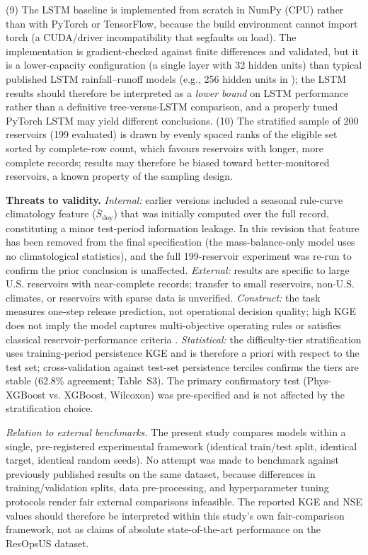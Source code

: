 \documentclass[journal]{ascelike-new}
\begin{document}
(9) The LSTM baseline is implemented from scratch in NumPy (CPU) rather than with PyTorch or TensorFlow, because the build environment cannot import torch (a CUDA/driver incompatibility that segfaults on load). The implementation is gradient-checked against finite differences and validated, but it is a lower-capacity configuration (a single layer with 32 hidden units) than typical published LSTM rainfall--runoff models (e.g., 256 hidden units in \citet{Kratzert2018}); the LSTM results should therefore be interpreted as a \emph{lower bound} on LSTM performance rather than a definitive tree-versus-LSTM comparison, and a properly tuned PyTorch LSTM may yield different conclusions. (10) The stratified sample of 200 reservoirs (199 evaluated) is drawn by evenly spaced ranks of the eligible set sorted by complete-row count, which favours reservoirs with longer, more complete records; results may therefore be biased toward better-monitored reservoirs, a known property of the sampling design.


\textbf{Threats to validity.} \emph{Internal:} earlier versions included a seasonal rule-curve climatology feature ($\bar S_{\text{doy}}$) that was initially computed over the full record, constituting a minor test-period information leakage. In this revision that feature has been removed from the final specification (the mass-balance-only model uses no climatological statistics), and the full 199-reservoir experiment was re-run to confirm the prior conclusion is unaffected. \emph{External:} results are specific to large U.S. reservoirs with near-complete records; transfer to small reservoirs, non-U.S. climates, or reservoirs with sparse data is unverified. \emph{Construct:} the task measures one-step release prediction, not operational decision quality; high KGE does not imply the model captures multi-objective operating rules or satisfies classical reservoir-performance criteria \citep{Hashimoto1982}. \emph{Statistical:} the difficulty-tier stratification uses training-period persistence KGE and is therefore a priori with respect to the test set; cross-validation against test-set persistence terciles confirms the tiers are stable (62.8\% agreement; Table~S3). The primary confirmatory test (Phys-XGBoost vs. XGBoost, Wilcoxon) was pre-specified and is not affected by the stratification choice.

\emph{Relation to external benchmarks.} The present study compares models within a single, pre-registered experimental framework (identical train/test split, identical target, identical random seeds). No attempt was made to benchmark against previously published results on the same dataset, because differences in training/validation splits, data pre-processing, and hyperparameter tuning protocols render fair external comparisons infeasible. The reported KGE and NSE values should therefore be interpreted within this study's own fair-comparison framework, not as claims of absolute state-of-the-art performance on the ResOpsUS dataset.
\end{document}
